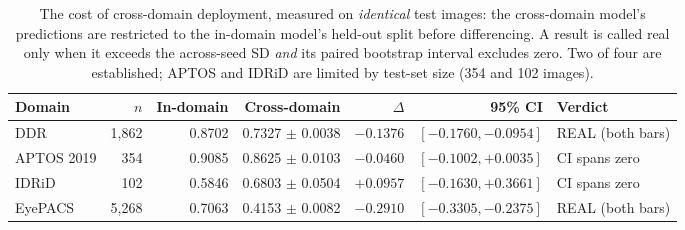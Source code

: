 \begin{table}[t]
\centering
\caption{The cost of cross-domain deployment, measured on \emph{identical} test images: the cross-domain model's predictions are restricted to the in-domain model's held-out split before differencing. A result is called real only when it exceeds the across-seed SD \emph{and} its paired bootstrap interval excludes zero. Two of four are established; APTOS and IDRiD are limited by test-set size (354 and 102 images).}
\label{tab:deployment}
\begin{tabular}{lrrrrrl}
\toprule
Domain & $n$ & In-domain & Cross-domain & $\Delta$ & 95\% CI & Verdict \\
\midrule
DDR & 1,862 & 0.8702 & 0.7327 $\pm$ 0.0038 & $-0.1376$ & $[-0.1760, -0.0954]$ & REAL (both bars) \\
APTOS 2019 & 354 & 0.9085 & 0.8625 $\pm$ 0.0103 & $-0.0460$ & $[-0.1002, +0.0035]$ & CI spans zero \\
IDRiD & 102 & 0.5846 & 0.6803 $\pm$ 0.0504 & $+0.0957$ & $[-0.1630, +0.3661]$ & CI spans zero \\
EyePACS & 5,268 & 0.7063 & 0.4153 $\pm$ 0.0082 & $-0.2910$ & $[-0.3305, -0.2375]$ & REAL (both bars) \\
\bottomrule
\end{tabular}
\end{table}